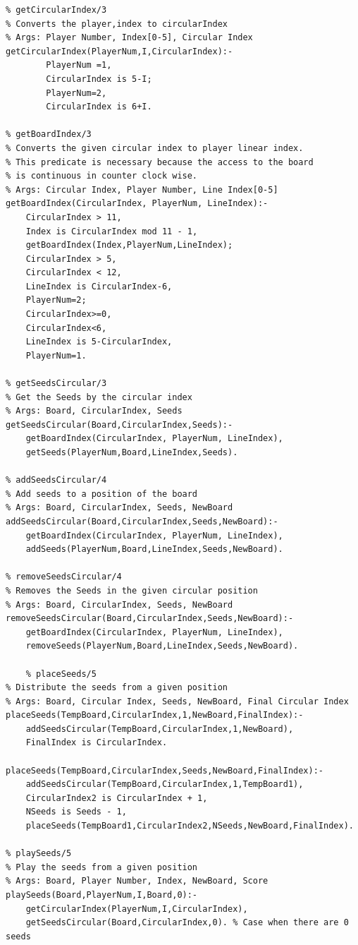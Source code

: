 \documentclass[15pt,a4paper]{article}
\begin{document}
\begin{verbatim}
% getCircularIndex/3
% Converts the player,index to circularIndex
% Args: Player Number, Index[0-5], Circular Index
getCircularIndex(PlayerNum,I,CircularIndex):-
		PlayerNum =1,
		CircularIndex is 5-I;
		PlayerNum=2,
		CircularIndex is 6+I.

% getBoardIndex/3
% Converts the given circular index to player linear index. 
% This predicate is necessary because the access to the board
% is continuous in counter clock wise.
% Args: Circular Index, Player Number, Line Index[0-5]
getBoardIndex(CircularIndex, PlayerNum, LineIndex):-
	CircularIndex > 11,
	Index is CircularIndex mod 11 - 1,
	getBoardIndex(Index,PlayerNum,LineIndex);
	CircularIndex > 5,
	CircularIndex < 12,
	LineIndex is CircularIndex-6,
	PlayerNum=2;
	CircularIndex>=0,
	CircularIndex<6,
	LineIndex is 5-CircularIndex,
	PlayerNum=1.

% getSeedsCircular/3
% Get the Seeds by the circular index
% Args: Board, CircularIndex, Seeds
getSeedsCircular(Board,CircularIndex,Seeds):-
	getBoardIndex(CircularIndex, PlayerNum, LineIndex),
	getSeeds(PlayerNum,Board,LineIndex,Seeds).
	
% addSeedsCircular/4
% Add seeds to a position of the board
% Args: Board, CircularIndex, Seeds, NewBoard
addSeedsCircular(Board,CircularIndex,Seeds,NewBoard):-
	getBoardIndex(CircularIndex, PlayerNum, LineIndex),
	addSeeds(PlayerNum,Board,LineIndex,Seeds,NewBoard).

% removeSeedsCircular/4
% Removes the Seeds in the given circular position
% Args: Board, CircularIndex, Seeds, NewBoard
removeSeedsCircular(Board,CircularIndex,Seeds,NewBoard):-
	getBoardIndex(CircularIndex, PlayerNum, LineIndex),
	removeSeeds(PlayerNum,Board,LineIndex,Seeds,NewBoard).

	% placeSeeds/5
% Distribute the seeds from a given position
% Args: Board, Circular Index, Seeds, NewBoard, Final Circular Index
placeSeeds(TempBoard,CircularIndex,1,NewBoard,FinalIndex):-
	addSeedsCircular(TempBoard,CircularIndex,1,NewBoard),
	FinalIndex is CircularIndex.	

placeSeeds(TempBoard,CircularIndex,Seeds,NewBoard,FinalIndex):-
	addSeedsCircular(TempBoard,CircularIndex,1,TempBoard1),
	CircularIndex2 is CircularIndex + 1,
	NSeeds is Seeds - 1,
	placeSeeds(TempBoard1,CircularIndex2,NSeeds,NewBoard,FinalIndex).

% playSeeds/5
% Play the seeds from a given position
% Args: Board, Player Number, Index, NewBoard, Score
playSeeds(Board,PlayerNum,I,Board,0):-
	getCircularIndex(PlayerNum,I,CircularIndex),
	getSeedsCircular(Board,CircularIndex,0). % Case when there are 0 seeds


\end{verbatim}
\end{document}
